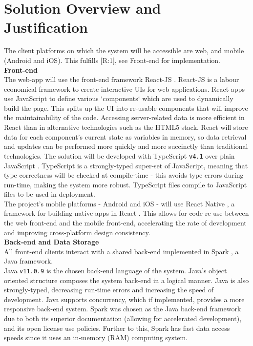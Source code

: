 \documentclass[9pt, titlepage]{extarticle}
\begin{document}
\section{Solution Overview and Justification}

The client platforms on which the system will be accessible are web, and mobile (Android and iOS). This fulfills [R:1], see Front-end for implementation. \\

\textbf{Front-end}\\
The web-app will use the front-end framework React-JS \autocite{web:react}. 
React-JS is a labour economical framework to create interactive UIs for web applications. React apps use JavaScript to define various `components` which are used to dynamically build the page. This splits up the UI into re-usable components that will improve the maintainability of the code. Accessing server-related data is more efficient in React than in alternative technologies such as the HTML5 stack. React will store data for each component's current state as variables in memory, so data retrieval and updates can be performed more quickly and more succinctly than traditional technologies. The solution will be developed with TypeScript \texttt{v4.1} \autocite{web:ts} over plain JavaScript \autocite{web:js}. TypeScript is a strongly-typed super-set of JavaScript, meaning that type correctness will be checked at compile-time - this avoids type errors during run-time, making the system more robust. TypeScript files compile to JavaScript files to be used in deployment. \\

The project's mobile platforms - Android and iOS - will use React Native \autocite{web:react-native}, a framework for building native apps in React \autocite{web:react}. This allows for code re-use between the web front-end and the mobile front-end, accelerating the rate of development and improving cross-platform design consistency. \\

\textbf{Back-end and Data Storage}\\
All front-end clients interact with a shared back-end implemented in Spark \autocite{web:spark}, a Java framework.\\

Java \texttt{v11.0.9} \autocite{java} is the chosen back-end language of the system. 
Java's object oriented structure composes the system back-end in a logical manner.
Java is also strongly-typed, decreasing run-time errors and increasing the speed of development. Java supports concurrency, which if implemented, provides a more responsive back-end system. Spark was chosen as the Java back-end framework due to both its superior documentation (allowing for accelerated development), and its open license use policies. Further to this, Spark has fast data access speeds since it uses an in-memory (RAM) computing system. \\
\end{document}
